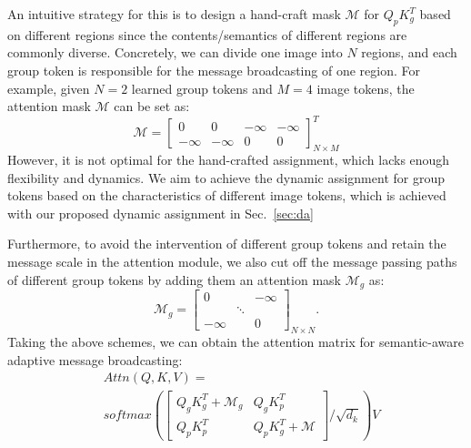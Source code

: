 \documentclass[journal]{IEEEtran}
\begin{document}
An intuitive strategy for this is to design a hand-craft mask $\mathcal{M}$ for $Q_pK_g^T$ based on different regions since the contents/semantics of different regions are commonly diverse. Concretely, we can divide one image into $N$ regions, and each group token is responsible for the message broadcasting of one region. For example, given $N=2$ learned group tokens and $M=4$ image tokens, the attention mask $\mathcal{M}$ can be set as:
\begin{equation}
     \mathcal{M} = \begin{bmatrix}
      0 & 0 & -\infty & -\infty  \\
      -\infty & -\infty & 0 & 0
  \end{bmatrix}^T_{N\times M}
  \label{eq:naive_mask}
\end{equation}
 However, it is not optimal for the hand-crafted assignment, which lacks enough flexibility and dynamics. We aim to achieve the dynamic assignment for group tokens based on the characteristics of different image tokens, which is achieved with our proposed dynamic assignment in Sec.~\ref{sec:da} 
 


Furthermore, to avoid the intervention of different group tokens and retain the message scale in the attention module, we also cut off the message passing paths of different group tokens by adding them an attention mask $\mathcal{M}_g$ as: 
\begin{equation}
    \mathcal{M}_g = \begin{bmatrix}
 0 & & -\infty \\
  & \ddots &  \\
  -\infty & & 0
  \end{bmatrix}_{N\times N}.
\end{equation}
Taking the above schemes, we can obtain the attention matrix for semantic-aware adaptive message broadcasting:
\begin{equation}
\begin{aligned}
    & Attn(Q,K,V) = \\ & softmax(\begin{bmatrix}
 Q_g K_g^T+\mathcal{M}_g & Q_g K_p^T \\
  Q_p K_p^T & Q_p K_g^T + \mathcal{M}
  \end{bmatrix}/{\sqrt{d_k}})V
\end{aligned}
\end{equation}
\end{document}
